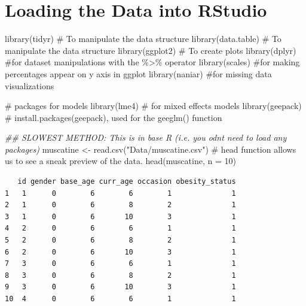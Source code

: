\documentclass[
  letterpaper,
  DIV=11,
  numbers=noendperiod]{scrreprt}
\newenvironment{Shaded}{\begin{snugshade}}{\end{snugshade}}
\newcommand{\AttributeTok}[1]{\textcolor[rgb]{0.40,0.45,0.13}{#1}}
\newcommand{\CommentTok}[1]{\textcolor[rgb]{0.37,0.37,0.37}{#1}}
\newcommand{\DecValTok}[1]{\textcolor[rgb]{0.68,0.00,0.00}{#1}}
\newcommand{\DocumentationTok}[1]{\textcolor[rgb]{0.37,0.37,0.37}{\textit{#1}}}
\newcommand{\FunctionTok}[1]{\textcolor[rgb]{0.28,0.35,0.67}{#1}}
\newcommand{\NormalTok}[1]{\textcolor[rgb]{0.00,0.23,0.31}{#1}}
\newcommand{\OtherTok}[1]{\textcolor[rgb]{0.00,0.23,0.31}{#1}}
\newcommand{\StringTok}[1]{\textcolor[rgb]{0.13,0.47,0.30}{#1}}
\begin{document}
\hypertarget{loading-the-data-into-rstudio}{%
\section{Loading the Data into
RStudio}\label{loading-the-data-into-rstudio}}

\begin{Shaded}
\begin{Highlighting}[]
\FunctionTok{library}\NormalTok{(tidyr)  }\CommentTok{\# To manipulate the data structure}
\FunctionTok{library}\NormalTok{(data.table)  }\CommentTok{\# To manipulate the data structure}
\FunctionTok{library}\NormalTok{(ggplot2)  }\CommentTok{\# To create plots}
\FunctionTok{library}\NormalTok{(dplyr)  }\CommentTok{\#for dataset manipulations with the \%\textgreater{}\% operator}
\FunctionTok{library}\NormalTok{(scales)  }\CommentTok{\#for making percentages appear on y axis in ggplot}
\FunctionTok{library}\NormalTok{(naniar)  }\CommentTok{\#for missing data visualizations}

\CommentTok{\# packages for models}
\FunctionTok{library}\NormalTok{(lme4)  }\CommentTok{\# for mixed effects models}
\FunctionTok{library}\NormalTok{(geepack)  }\CommentTok{\# install.packages(\textquotesingle{}geepack\textquotesingle{}), used for the geeglm() function}
\end{Highlighting}
\end{Shaded}

\begin{Shaded}
\begin{Highlighting}[]
\DocumentationTok{\#\# SLOWEST METHOD: This is in base R (i.e. you odn\textquotesingle{}t need to load any packages)}
\NormalTok{muscatine }\OtherTok{\textless{}{-}} \FunctionTok{read.csv}\NormalTok{(}\StringTok{"Data/muscatine.csv"}\NormalTok{)}
\CommentTok{\# head function allows us to see a sneak preview of the data.}
\FunctionTok{head}\NormalTok{(muscatine, }\AttributeTok{n =} \DecValTok{10}\NormalTok{)}
\end{Highlighting}
\end{Shaded}

\begin{verbatim}
   id gender base_age curr_age occasion obesity_status
1   1      0        6        6        1              1
2   1      0        6        8        2              1
3   1      0        6       10        3              1
4   2      0        6        6        1              1
5   2      0        6        8        2              1
6   2      0        6       10        3              1
7   3      0        6        6        1              1
8   3      0        6        8        2              1
9   3      0        6       10        3              1
10  4      0        6        6        1              1
\end{verbatim}
\end{document}
